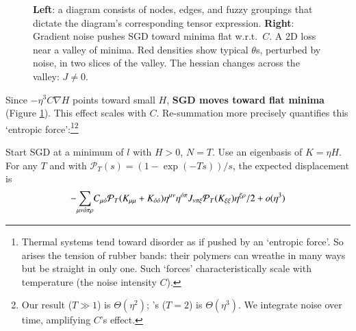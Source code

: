 \begin{figure}%
    \centering
    \caption{%
        \textbf{Left}:
        a diagram consists of nodes,
                  edges, and fuzzy groupings that dictate the diagram's
                  corresponding tensor expression.
        \textbf{Right}:         %
        Gradient noise pushes SGD toward minima flat w.r.t.\ $C$.
            A 2D loss near
            a valley of minima.  Red densities show typical
            $\theta$s, perturbed by noise,
            in two slices of the valley.  The hessian
            changes across the valley: $J \neq 0$.  
    }
    \label{fig:cubic}
\end{figure}
Since $-\eta^3 C\nabla H$ points toward small $H$, \textbf{SGD moves
toward flat minima} (Figure \ref{fig:cubic}).
This effect scales with $C$.  
%
%
Re-summation more precisely quantifies this `entropic force':\footnote{
    Thermal systems tend toward disorder as if pushed by an
    `entropic force'.
    So arises the tension of rubber
    bands: their polymers can wreathe in
    many ways but be straight in only one.
    Such `forces' characteristically 
    scale with
    temperature (the noise intensity $C$).
}\footnote{
    Our result ($T\gg 1$) is $\Theta(\eta^2)$; \cite{ya19b}'s
    ($T=2$) is $\Theta(\eta^3)$.  We
    integrate noise over time, amplifying $C$'s
    effect. 
}
%
\begin{cor}\label{cor:entropic}%
    Start SGD at a minimum of $l$ with $H>0$, $N=T$.  Use
    an eigenbasis of $K=\eta H$.  
    For any $T$ and
    with ${\mathcal P}_T(s) = (1 - \exp(-Ts))/s$,
    the 
    expected displacement is
    $$
        -
        {\sum_{\mu\nu   {\acute{o}}\pi\rho}}
            C_{\mu{\acute{o}}}
            {{\mathcal P}_T(K_{\mu\mu} + K_{{\acute{o}}{\acute{o}}})}
            \eta^{\mu\nu}\eta^{{\acute{o}}\pi}
            J_{\nu\pi\xi}
            {{\mathcal P}_T(K_{\xi\xi})}\eta^{\xi\rho}/2
        + o(\eta^3)
    $$
\end{cor}

